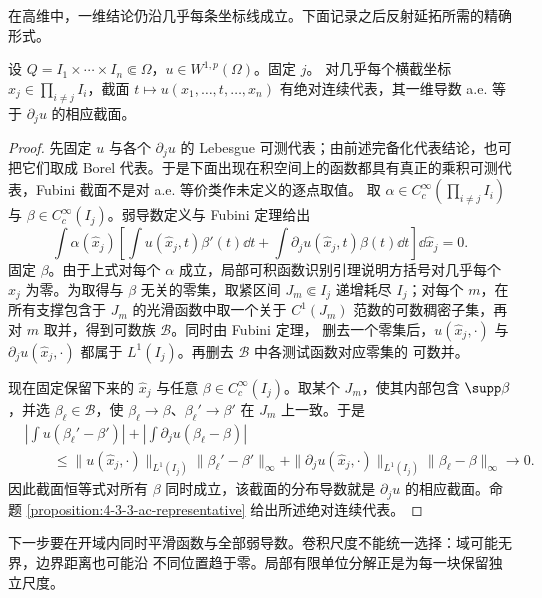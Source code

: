 在高维中，一维结论仍沿几乎每条坐标线成立。下面记录之后反射延拓所需的精确形式。

\begin{lemma}[坐标线上的绝对连续性]\label{lemma:4-3-3-acl}
设 $Q=I_1\times\cdots\times I_n\Subset\Omega$，$u\in W^{1,p}(\Omega)$。固定 $j$。
对几乎每个横截坐标 $\widehat x_j\in\prod_{i\ne j}I_i$，截面
$t\mapsto u(x_1,\ldots,t,\ldots,x_n)$ 有绝对连续代表，其一维导数 a.e. 等于
$\partial_ju$ 的相应截面。
\end{lemma}

\begin{proof}
先固定 $u$ 与各个 $\partial_ju$ 的 Lebesgue 可测代表；由前述完备化代表结论，也可把它们取成
Borel 代表。于是下面出现在积空间上的函数都具有真正的乘积可测代表，Fubini 截面不是对
a.e. 等价类作未定义的逐点取值。
取 $\alpha\in C_c^\infty(\prod_{i\ne j}I_i)$ 与
$\beta\in C_c^\infty(I_j)$。弱导数定义与 Fubini 定理给出
\[
 \int\alpha(\widehat x_j)
 \left[\int u(\widehat x_j,t)\beta'(t)\dd t
       +\int\partial_ju(\widehat x_j,t)\beta(t)\dd t\right]
 \dd\widehat x_j=0.
\]
固定 $\beta$。由于上式对每个 $\alpha$ 成立，局部可积函数识别引理说明方括号对几乎每个
$\widehat x_j$ 为零。为取得与 $\beta$ 无关的零集，取紧区间
$J_m\Subset I_j$ 递增耗尽 $I_j$；对每个 $m$，在所有支撑包含于 $J_m$ 的光滑函数中取一个关于
$C^1(J_m)$ 范数的可数稠密子集，再对 $m$ 取并，得到可数族 $\mathcal B$。同时由 Fubini 定理，
删去一个零集后，$u(\widehat x_j,\cdot)$ 与
$\partial_ju(\widehat x_j,\cdot)$ 都属于 $L^1(I_j)$。再删去 $\mathcal B$ 中各测试函数对应零集的
可数并。

现在固定保留下来的 $\widehat x_j$ 与任意 $\beta\in C_c^\infty(I_j)$。取某个 $J_m$，使其内部包含
$\supp\beta$，并选 $\beta_\ell\in\mathcal B$，使
$\beta_\ell\to\beta$、$\beta_\ell'\to\beta'$ 在 $J_m$ 上一致。于是
\begin{align*}
 &\left|\int u(\beta_\ell'-\beta')\right|
 +\left|\int\partial_ju(\beta_\ell-\beta)\right|\\
 &\qquad\leq
 \|u(\widehat x_j,\cdot)\|_{L^1(I_j)}
       \|\beta_\ell'-\beta'\|_\infty
 +\|\partial_ju(\widehat x_j,\cdot)\|_{L^1(I_j)}
       \|\beta_\ell-\beta\|_\infty
 \longrightarrow0.
\end{align*}
因此截面恒等式对所有 $\beta$ 同时成立，该截面的分布导数就是
$\partial_ju$ 的相应截面。命题
\ref{proposition:4-3-3-ac-representative} 给出所述绝对连续代表。
\end{proof}

下一步要在开域内同时平滑函数与全部弱导数。卷积尺度不能统一选择：域可能无界，边界距离也可能沿
不同位置趋于零。局部有限单位分解正是为每一块保留独立尺度。

